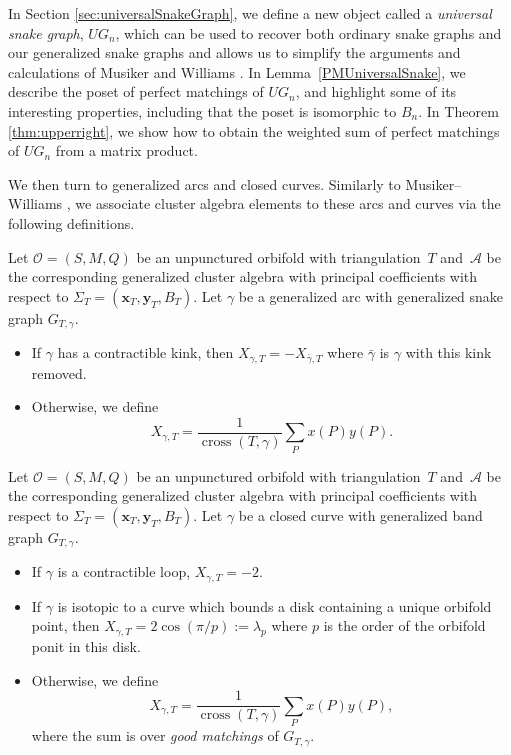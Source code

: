 \documentclass[pdftex]{sigma}%
\numberwithin{equation}{section}
\begin{document}
In Section \ref{sec:universalSnakeGraph}, we define a new object called a \emph{universal snake graph}, $UG_n$, which can be used to recover both ordinary snake graphs and our generalized snake graphs and allows us to simplify the arguments and calculations of Musiker and Williams \cite{MW}. In Lemma~\ref{PMUniversalSnake}, we describe the poset of perfect matchings of $UG_n$, and highlight some of its interesting properties, including that the poset is isomorphic to $B_n$. In Theorem \ref{thm:upperright}, we show how to obtain the weighted sum of perfect matchings of $UG_n$ from a matrix product.

We then turn to generalized arcs and closed curves. Similarly to Musiker--Williams \cite{MW}, we associate cluster algebra elements to these arcs and curves via the following definitions.

\begin{Definition}\label{def:genArc}
Let $\mathcal{O} = (S,M,Q)$ be an unpunctured orbifold with triangulation~$T$ and~$\mathcal{A}$ be the corresponding generalized cluster algebra with principal coefficients with respect to $\Sigma_T = (\mathbf{x}_T,\mathbf{y}_T,B_T)$. Let $\gamma$ be a generalized arc with generalized snake graph $G_{T,\gamma}$.
\begin{itemize}\itemsep=0pt
 \item If $\gamma$ has a contractible kink, then $X_{\gamma,T} = -X_{\bar{\gamma},T}$ where $\bar{\gamma}$ is $\gamma$ with this kink removed.
 \item Otherwise, we define \[X_{\gamma,T} = \frac{1}{\operatorname{cross}(T,\gamma)} \sum_P x(P)y(P). \]
\end{itemize}
\end{Definition}

\begin{Definition}\label{def:closedcurve}
Let $\mathcal{O} = (S,M,Q)$ be an unpunctured orbifold with triangulation~$T$ and~$\mathcal{A}$ be the corresponding generalized cluster algebra with principal coefficients with respect to $\Sigma_T = (\mathbf{x}_T,\mathbf{y}_T,B_T)$. Let $\gamma$ be a closed curve with generalized band graph $G_{T,\gamma}$.
\begin{itemize}\itemsep=0pt
 \item If $\gamma$ is a contractible loop, $X_{\gamma,T} = -2$.
 \item If $\gamma$ is isotopic to a curve which bounds a disk containing a unique orbifold point, then $X_{\gamma,T} = 2\cos(\pi/p):= \lambda_p$ where $p$ is the order of the orbifold ponit in this disk.
 \item Otherwise, we define \[X_{\gamma,T} = \frac{1}{\operatorname{cross}(T,\gamma)} \sum_P x(P)y(P), \]
 where the sum is over \emph{good matchings} of $G_{T,\gamma}$.
\end{itemize}
\end{Definition}
\end{document}
